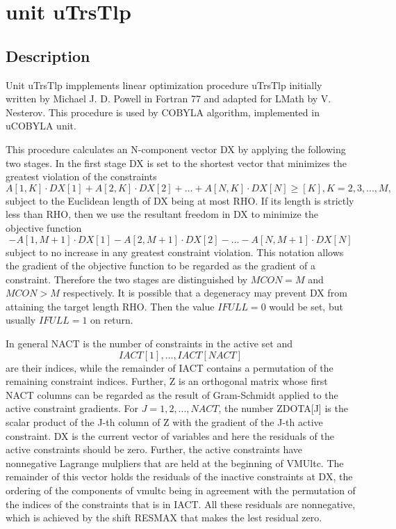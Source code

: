\documentclass[12pt,a4paper,oneside]{report}
\newcommand{\lmatha}[1]{   %
	\marginpar{\vspace{#1} 
		\begin{flushright}
			LMath 0.5
	\end{flushright} }
}
\begin{document}
\section{unit uTrsTlp}\label{sec:unit-utrstlp}
\lmatha{-24pt}
\subsection{Description}
Unit uTrsTlp impplements linear optimization procedure uTrsTlp initially written by Michael J. D. Powell in Fortran 77 and adapted for LMath by V. Nesterov. This procedure is used by COBYLA algorithm, implemented in uCOBYLA unit.

 This procedure calculates an N-component vector DX by applying the
following two stages. In the first stage DX is set to the shortest
vector that minimizes the greatest violation of the constraints
$$A[1,K]\cdot DX[1]+A[2,K]\cdot DX[2]+\dots+A[N,K]\cdot DX[N] \geq [K], K = 2,3,...,M,$$
subject to the Euclidean length of DX being at most RHO. If its length is
strictly less than RHO, then we use the resultant freedom in DX to
minimize the objective function
$$-A[1,M+1] \cdot DX[1]-A[2,M+1]\cdot DX[2]-\dots-A[N,M+1]\cdot DX[N]$$
subject to no increase in any greatest constraint violation. This
notation allows the gradient of the objective function to be regarded as
the gradient of a constraint. Therefore the two stages are distinguished
by $MCON = M$ and $MCON > M$ respectively. It is possible that a
degeneracy may prevent DX from attaining the target length RHO. Then the
value $IFULL = 0$ would be set, but usually $IFULL = 1$ on return.

In general NACT is the number of constraints in the active set and
$$IACT[1],\dots,IACT[NACT]$$ are their indices, while the remainder of IACT
contains a permutation of the remaining constraint indices. Further, Z is
an orthogonal matrix whose first NACT columns can be regarded as the
result of Gram-Schmidt applied to the active constraint gradients. For
$J = 1,2,...,NACT$, the number ZDOTA[J] is the scalar product of the J-th
column of Z with the gradient of the J-th active constraint. DX is the
current vector of variables and here the residuals of the active
constraints should be zero. Further, the active constraints have
nonnegative Lagrange mulpliers that are held at the beginning of
VMUltc. The remainder of this vector holds the residuals of the inactive
constraints at DX, the ordering of the components of vmultc being in
agreement with the permutation of the indices of the constraints that is
in IACT. All these residuals are nonnegative, which is achieved by the
shift RESMAX that makes the lest residual zero.
\end{document}
